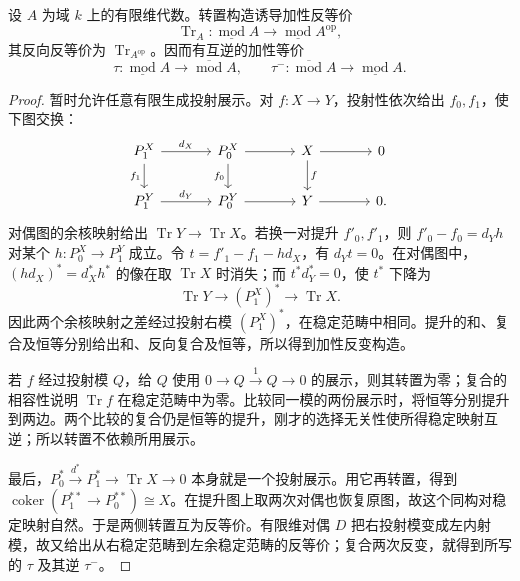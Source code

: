 \begin{proposition}\label{b5:prop:ar-transpose-equivalence}
	设 \(A\) 为域 \(k\) 上的有限维代数。转置构造诱导加性反等价
	\[
		\operatorname{Tr}_A:\underline{\operatorname{mod}}A
		\longrightarrow\underline{\operatorname{mod}}A^{\mathrm{op}},
	\]
	其反向反等价为 \(\operatorname{Tr}_{A^{\mathrm{op}}}\)。因而有互逆的加性等价
	\[
		\tau:\underline{\operatorname{mod}}A
		\longrightarrow\overline{\operatorname{mod}}A,
		\qquad
		\tau^-:\overline{\operatorname{mod}}A
		\longrightarrow\underline{\operatorname{mod}}A.
	\]
\end{proposition}
\begin{proof}
	暂时允许任意有限生成投射展示。对 \(f:X\to Y\)，投射性依次给出 \(f_0,f_1\)，使下图交换：
	\[
		\begin{tikzcd}[column sep=large]
			P_1^X\arrow[r,"d_X"]\arrow[d,"f_1"']&P_0^X\arrow[r]\arrow[d,"f_0"']&X\arrow[r]\arrow[d,"f"]&0\\
			P_1^Y\arrow[r,"d_Y"]&P_0^Y\arrow[r]&Y\arrow[r]&0.
		\end{tikzcd}
	\]
	对偶图的余核映射给出 \(\operatorname{Tr}Y\to\operatorname{Tr}X\)。若换一对提升 \(f'_0,f'_1\)，则 \(f'_0-f_0=d_Yh\) 对某个 \(h:P_0^X\to P_1^Y\) 成立。令 \(t=f'_1-f_1-hd_X\)，有 \(d_Yt=0\)。在对偶图中，\((hd_X)^*=d_X^*h^*\) 的像在取 \(\operatorname{Tr}X\) 时消失；而 \(t^*d_Y^*=0\)，使 \(t^*\) 下降为
	\[
		\operatorname{Tr}Y\longrightarrow(P_1^X)^*
		\longrightarrow\operatorname{Tr}X.
	\]
	因此两个余核映射之差经过投射右模 \((P_1^X)^*\)，在稳定范畴中相同。提升的和、复合及恒等分别给出和、反向复合及恒等，所以得到加性反变构造。

	若 \(f\) 经过投射模 \(Q\)，给 \(Q\) 使用 \(0\to Q\xrightarrow{1}Q\to0\) 的展示，则其转置为零；复合的相容性说明 \(\operatorname{Tr}f\) 在稳定范畴中为零。比较同一模的两份展示时，将恒等分别提升到两边。两个比较的复合仍是恒等的提升，刚才的选择无关性使所得稳定映射互逆；所以转置不依赖所用展示。

	最后，\(P_0^*\xrightarrow{d^*}P_1^*\to\operatorname{Tr}X\to0\) 本身就是一个投射展示。用它再转置，得到 \(\operatorname{coker}(P_1^{**}\to P_0^{**})\cong X\)。在提升图上取两次对偶也恢复原图，故这个同构对稳定映射自然。于是两侧转置互为反等价。有限维对偶 \(D\) 把右投射模变成左内射模，故又给出从右稳定范畴到左余稳定范畴的反等价；复合两次反变，就得到所写的 \(\tau\) 及其逆 \(\tau^-\)。
\end{proof}

